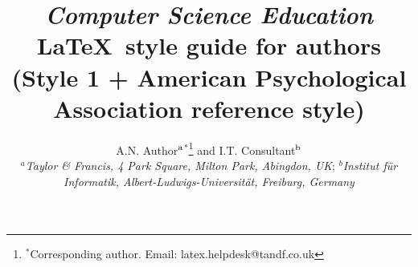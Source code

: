 \documentclass{nCSE2e}
\begin{document}


\title{{\itshape Computer Science Education} \LaTeX\ style guide for authors \break (Style 1 + American Psychological Association reference style)}

\author{A.N. Author$^{\rm a}$$^{\ast}$\thanks{$^\ast$Corresponding author. Email: latex.helpdesk@tandf.co.uk
\vspace{6pt}} and I.T. Consultant$^{\rm b}$\\\vspace{6pt}  $^{a}${\em{Taylor \& Francis, 4 Park Square, Milton Park, Abingdon, UK}};
$^{b}${\em{Institut f\"{u}r Informatik, Albert-Ludwigs-Universit\"{a}t, Freiburg, Germany}}\\
 }

\maketitle
\end{document}
